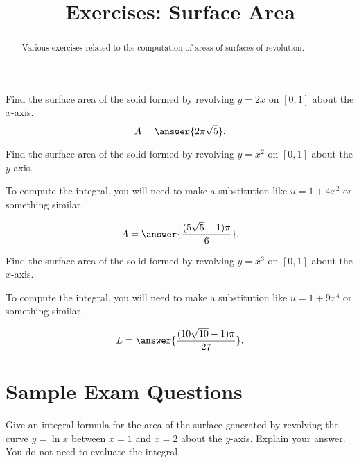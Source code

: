 \documentclass{ximera}
\title{Exercises: Surface Area}
\begin{document}
\begin{abstract}
Various exercises related to the computation of areas of surfaces of revolution.
\end{abstract}
\maketitle


\begin{exercise}%
Find the surface area of the solid formed by revolving \(y=2x\) on \([0,1]\) about the \(x\)-axis.
\[ A = \answer{2\pi\sqrt{5}}. \]
%
%
\end{exercise}

\begin{exercise}%
Find the surface area of the solid formed by revolving \(y=x^2\) on \([0,1]\) about the \(y\)-axis.
\begin{hint}
To compute the integral, you will need to make a substitution like $u = 1 + 4x^2$ or something similar.
\end{hint}
\[ A = \answer{\frac{(5 \sqrt{5} - 1) \pi}{6}}. \]
%
%
\end{exercise}

\begin{exercise}%
Find the surface area of the solid formed by revolving \(y=x^3\) on \([0,1]\) about the \(x\)-axis.
\begin{hint}
To compute the integral, you will need to make a substitution like $u = 1 + 9 x^4$ or something similar.
\end{hint}
\[ L = \answer{\frac{(10 \sqrt{10} - 1) \pi}{27}}. \]
%
%
\end{exercise}

\section*{Sample Exam Questions}

\begin{question}%
Give an integral formula for the area of the surface generated by revolving the curve $y = \ln x$ between $x=1$ and $x=2$ about the $y$-axis. Explain your answer. You do not need to evaluate the integral. 
\begin{multiplechoice}
\end{multiplechoice}
\end{question}
\end{document}
